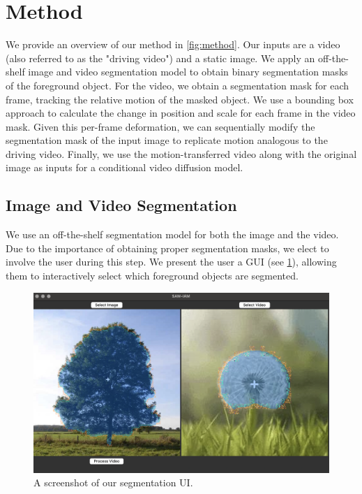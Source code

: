 \section{Method}

We provide an overview of our method in \cref{fig:method}. Our inputs are a video (also referred to as the "driving video") and a static image.
We apply an off-the-shelf image and video segmentation model\cite{ravi2024sam2} to obtain binary segmentation masks of the foreground object.
For the video, we obtain a segmentation mask for each frame, tracking the relative motion of the masked object.
We use a bounding box approach to calculate the change in position and scale for each frame in the video mask.
Given this per-frame deformation, we can sequentially modify the segmentation mask of the input image to replicate motion analogous to the driving video.
Finally, we use the motion-transferred video along with the original image as inputs for a conditional video diffusion model\cite{2023videocomposer}.

\subsection{Image and Video Segmentation}

We use an off-the-shelf segmentation model\cite{ravi2024sam2} for both the image and the video.
Due to the importance of obtaining proper segmentation masks, we elect to involve the user during this step.
We present the user a GUI (see \cref{fig:ui}), allowing them to interactively select which foreground objects are segmented.

\begin{figure}[t]
    \centering
    \includegraphics[width=1\linewidth]{media/ui.png}
    \caption{A screenshot of our segmentation UI.}
    \label{fig:ui}
\end{figure}

